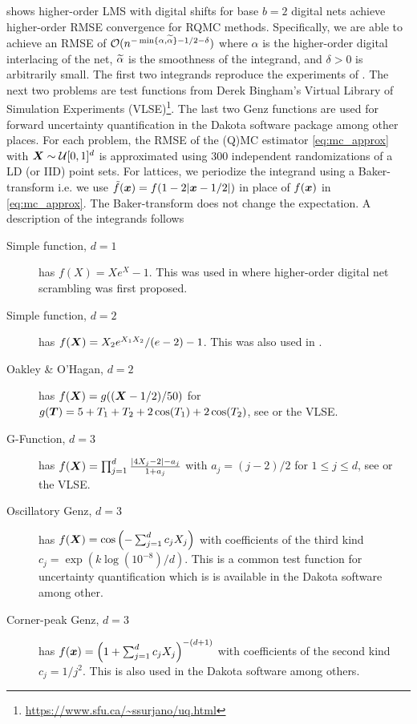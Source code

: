 \documentclass[acmsmall]{acmart}
\begin{document}
 shows higher-order LMS with digital shifts for base $b=2$ digital nets achieve higher-order RMSE convergence for RQMC methods. Specifically, we are able to achieve an RMSE of ${\mathcal{O}}(n^{-\min\{\alpha,{\widetilde{\alpha}}\}-1/2-\delta})$ where $\alpha$ is the higher-order digital interlacing of the net, ${\widetilde{\alpha}}$ is the smoothness of the integrand, and $\delta>0$ is arbitrarily small.  The first two integrands reproduce the experiments of \citep{dick.higher_order_scrambled_digital_nets}. The next two problems are test functions from Derek Bingham's Virtual Library of Simulation Experiments (VLSE)\footnote{\label{fn:VLSE}\url{https://www.sfu.ca/~ssurjano/uq.html}}. The last two Genz functions are used for forward uncertainty quantification in the Dakota software package \citep{adams2020dakota} among other places. For each problem, the RMSE of the (Q)MC estimator  \eqref{eq:mc_approx} with ${\boldsymbol{X}} \sim {\mathcal{U}}[0,1]^d$ is approximated using $300$ independent randomizations of a LD (or IID) point sets. For lattices, we periodize the integrand using a Baker-transform i.e. we use $\tilde{f}({\boldsymbol{x}}) = f(1-2\lvert {\boldsymbol{x}}-1/2\rvert)$ in place of $f({\boldsymbol{x}})$ in \eqref{eq:mc_approx}. The Baker-transform does not change the expectation. A description of the integrands follows 
\begin{description}
    \item[Simple function, $d=1$] has $f(X) = X e^X-1$. This was used in \citep{dick.higher_order_scrambled_digital_nets} where higher-order digital net scrambling was first proposed.
    \item[Simple function, $d=2$] has $f({\boldsymbol{X}}) = X_2 e^{X_1 X_2}/(e-2)-1$. This was also used in \citep{dick.higher_order_scrambled_digital_nets}.
    \item[Oakley \& O'Hagan, $d=2$] has $f({\boldsymbol{X}}) = g(({\boldsymbol{X}}-1/2)/50)$ for $g({\boldsymbol{T}}) = 5+T_1+T_2+2\cos(T_1)+2\cos(T_2)$, see \citep{oakley2002bayesian} or the VLSE.
    \item[G-Function, $d=3$] has $f({\boldsymbol{X}}) = \prod_{j=1}^d \frac{\lvert 4X_j-2\rvert-a_j}{1+a_j}$ with $a_j = (j-2)/2$ for $1 \leq j \leq d$, see  \citep{crestaux2007polynomial,marrel2009calculations} or the VLSE. 
    \item[Oscillatory Genz, $d=3$] has $f({\boldsymbol{X}}) = \cos\left(-\sum_{j=1}^d c_j X_j \right)$ with coefficients of the third kind $c_j = \exp\left(k \log\left(10^{-8}\right)/d\right)$. This is a common test function for uncertainty quantification which is is available in the Dakota software \citep{adams2020dakota} among other.  
    \item[Corner-peak Genz, $d=3$] has $f({\boldsymbol{x}}) = \left(1+\sum_{j=1}^d c_j X_j\right)^{-(d+1)}$ with coefficients of the second kind $c_j = 1/j^2$. This is also used in the Dakota software \citep{adams2020dakota} among others. 
\end{description}
\end{document}
